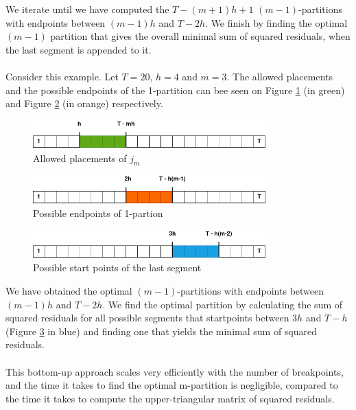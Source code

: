 \documentclass[main.tex]{subfiles}
\begin{document}
We iterate until we have computed the $T - (m + 1)h + 1$
$(m-1)$-partitions with endpoints between $(m-1)h$ and $T-2h$.
We finish by finding the optimal $(m-1)$ partition that gives the overall
minimal sum of squared residuals, when the last segment is appended to it.\\\\
Consider this example. Let $T=20$, $h=4$ and $m=3$. The allowed placements
and the possible endpoints of the 1-partition can bee seen on Figure \ref{plt_4_1} (in
green) and Figure \ref{plt_4_2} (in orange) respectively. 

\begin{figure}[H]
  \centering
  \includegraphics[width=0.8\textwidth]{imgs/breakpoints1}
  \caption{Allowed placements of $j_m$}
  \label{plt_4_1}
\end{figure}

\begin{figure}[H]
  \centering
  \includegraphics[width=0.8\textwidth]{imgs/breakpoints2}
  \caption{Possible endpoints of 1-partion}
  \label{plt_4_2}
\end{figure}

\begin{figure}[H]
  \centering
  \includegraphics[width=0.8\textwidth]{imgs/breakpoints3}
  \caption{Possible start points of the last segment}
  \label{plt_4_3}
\end{figure}
We have obtained the optimal $(m - 1)$-partitions with endpoints between
$(m - 1)h$
and $T - 2h$. We find the optimal partition by calculating the sum of squared
residuals for all possible segments that startpoints between $3h$ and $T - h$
(Figure \ref{plt_4_3} in blue) and finding one that yields the minimal sum of
squared residuals.\\\\
This bottom-up approach scales very efficiently with the number of breakpoints,
and the time it takes to find the optimal m-partition is negligible, compared to
the time it takes to compute the upper-triangular matrix of squared residuals.
\end{document}
